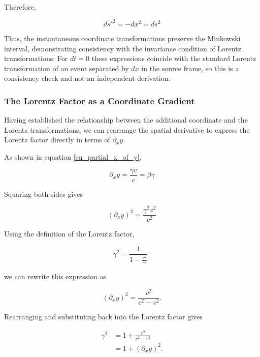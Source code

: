 \documentclass[pdflatex,sn-mathphys-num]{sn-jnl}%
\theoremstyle{thmstyleone}%
\theoremstyle{thmstyletwo}%
\theoremstyle{thmstylethree}%
\begin{document}
Therefore,

\begin{equation}
    \boxed{
    ds'^2=-dx^2=ds^2
    }
\end{equation}

Thus, the instantaneous coordinate transformations preserve the Minkowski interval, demonstrating consistency with the invariance condition of Lorentz transformations. For $dt=0$ these expressions coincide with the standard Lorentz transformation of an event separated by $dx$ in the source frame, so this is a consistency check and not an independent derivation. 

\subsubsection{The Lorentz Factor as a Coordinate Gradient}

Having established the relationship between the additional coordinate and the Lorentz transformations, we can rearrange the spatial derivative to express the Lorentz factor directly in terms of $\partial_x y$.

As shown in equation \ref{eq_partial_x_of_y},

\begin{equation}
    \partial_x y = \frac{\gamma v}{c} = \beta \gamma
\end{equation}

Squaring both sides gives

\begin{equation}
    (\partial_x y)^2 = \frac{\gamma^2 v^2}{c^2}
\end{equation}

Using the definition of the Lorentz factor,

\begin{equation}
    \gamma^2 = \frac{1}{1-\frac{v^2}{c^2}},
\end{equation}

we can rewrite this expression as

\begin{equation}
    (\partial_x y)^2
    =
    \frac{v^2}{c^2-v^2}.
\end{equation}

Rearranging and substituting back into the Lorentz factor gives

\begin{equation}
\begin{aligned}
    \gamma^2
    &=
    1+\frac{v^2}{c^2-v^2}
    \\[6pt]
    &=
    1+(\partial_x y)^2.
\end{aligned}
\end{equation}
\end{document}
